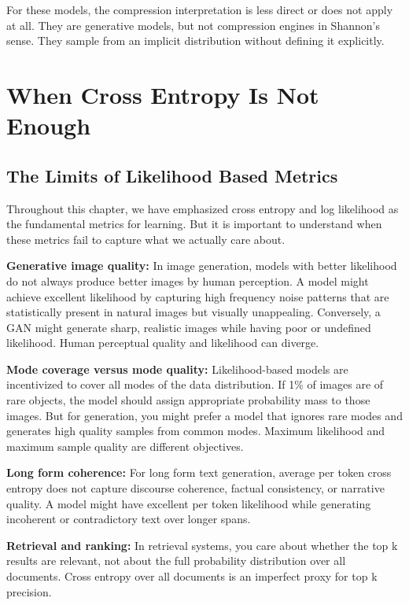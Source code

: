For these models, the compression interpretation is less direct or does not apply at all. They are generative models, but not compression engines in Shannon's sense. They sample from an implicit distribution without defining it explicitly.

\vspace{2em}

\section{When Cross Entropy Is Not Enough}

\subsection{The Limits of Likelihood Based Metrics}

Throughout this chapter, we have emphasized cross entropy and log likelihood as the fundamental metrics for learning. But it is important to understand when these metrics fail to capture what we actually care about.

\textbf{Generative image quality:} In image generation, models with better likelihood do not always produce better images by human perception. A model might achieve excellent likelihood by capturing high frequency noise patterns that are statistically present in natural images but visually unappealing. Conversely, a GAN might generate sharp, realistic images while having poor or undefined likelihood. Human perceptual quality and likelihood can diverge.

\textbf{Mode coverage versus mode quality:} Likelihood-based models are incentivized to cover all modes of the data distribution. If 1\% of images are of rare objects, the model should assign appropriate probability mass to those images. But for generation, you might prefer a model that ignores rare modes and generates high quality samples from common modes. Maximum likelihood and maximum sample quality are different objectives.

\textbf{Long form coherence:} For long form text generation, average per token cross entropy does not capture discourse coherence, factual consistency, or narrative quality. A model might have excellent per token likelihood while generating incoherent or contradictory text over longer spans.

\textbf{Retrieval and ranking:} In retrieval systems, you care about whether the top k results are relevant, not about the full probability distribution over all documents. Cross entropy over all documents is an imperfect proxy for top k precision.

